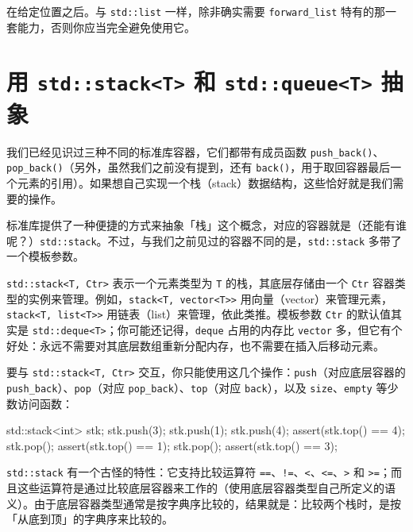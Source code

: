在给定位置之后。与 \texttt{std::\allowbreak{}list} 一样，除非确实需要 \texttt{forward\_\allowbreak{}list} 特有的那一套能力，否则你应当完全避免使用它。

\section{用 \texttt{std::\allowbreak{}stack<\allowbreak{}T>\allowbreak{}} 和 \texttt{std::\allowbreak{}queue<\allowbreak{}T>\allowbreak{}} 抽象}

我们已经见识过三种不同的标准库容器，它们都带有成员函数 \texttt{push\_\allowbreak{}back(\allowbreak{})\allowbreak{}}、\texttt{pop\_\allowbreak{}back(\allowbreak{})\allowbreak{}}（另外，虽然我们之前没有提到，还有 \texttt{back(\allowbreak{})\allowbreak{}}，用于取回容器最后一个元素的引用）。如果想自己实现一个栈（stack）数据结构，这些恰好就是我们需要的操作。

标准库提供了一种便捷的方式来抽象「栈」这个概念，对应的容器就是（还能有谁呢？）\texttt{std::\allowbreak{}stack}。不过，与我们之前见过的容器不同的是，\texttt{std::\allowbreak{}stack} 多带了一个模板参数。

\texttt{std::\allowbreak{}stack<\allowbreak{}T,\allowbreak{} Ctr>\allowbreak{}} 表示一个元素类型为 \texttt{T} 的栈，其底层存储由一个 \texttt{Ctr} 容器类型的实例来管理。例如，\texttt{stack<\allowbreak{}T,\allowbreak{} vector<\allowbreak{}T>\allowbreak{}>} 用向量（vector）来管理元素，\texttt{stack<\allowbreak{}T,\allowbreak{} list<\allowbreak{}T>\allowbreak{}>} 用链表（list）来管理，依此类推。模板参数 \texttt{Ctr} 的默认值其实是 \texttt{std::\allowbreak{}deque<\allowbreak{}T>\allowbreak{}}；你可能还记得，\texttt{deque} 占用的内存比 \texttt{vector} 多，但它有个好处：永远不需要对其底层数组重新分配内存，也不需要在插入后移动元素。

要与 \texttt{std::\allowbreak{}stack<\allowbreak{}T,\allowbreak{} Ctr>\allowbreak{}} 交互，你只能使用这几个操作：\texttt{push}（对应底层容器的 \texttt{push\_\allowbreak{}back}）、\texttt{pop}（对应 \texttt{pop\_\allowbreak{}back}）、\texttt{top}（对应 \texttt{back}），以及 \texttt{size}、\texttt{empty} 等少数访问函数：

\begin{codebox}[cpp]
    std::stack<int> stk;
    stk.push(3); stk.push(1); stk.push(4);
    assert(stk.top() == 4);
    stk.pop();
    assert(stk.top() == 1);
    stk.pop();
    assert(stk.top() == 3);
\end{codebox}

\texttt{std::\allowbreak{}stack} 有一个古怪的特性：它支持比较运算符 \texttt{==}、\texttt{!=}、\texttt{<}、\texttt{<=}、\texttt{>} 和 \texttt{>=}；而且这些运算符是通过比较底层容器来工作的（使用底层容器类型自己所定义的语义）。由于底层容器类型通常是按字典序比较的，结果就是：比较两个栈时，是按「从底到顶」的字典序来比较的。


